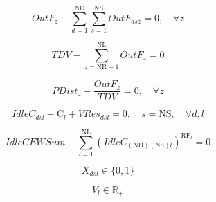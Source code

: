 \documentclass{singlecol}
\theoremstyle{TH}{
\newtheorem{lemma}{Lemma}
\newtheorem{theorem}[lemma]{Theorem}
\newtheorem{corrolary}[lemma]{Corrolary}
\newtheorem{conjecture}[lemma]{Conjecture}
\newtheorem{proposition}[lemma]{Proposition}
\newtheorem{claim}[lemma]{Claim}
\newtheorem{stheorem}[lemma]{Wrong Theorem}
\newtheorem{algorithm}{Algorithm}
}
\theoremstyle{THrm}{
\newtheorem{definition}{Definition}[section]
\newtheorem{question}{Question}[section]
\newtheorem{remark}{Remark}
\newtheorem{scheme}{Scheme}
}
\theoremstyle{THhit}{
\newtheorem{case}{Case}[section]
}
\begin{document}
\begin{equation}
	OutF_{z} - \sum_{d=1}^{\mathrm{ND}}\sum_{s=1}^{\mathrm{NS}}{OutF_{dsz}} = 0, \quad \forall z
	\label{eq:evalTOutFZone}
\end{equation}

\begin{equation}
	TDV - \sum_{z=\mathrm{NR}+1}^{\mathrm{NL}}{OutF_{z}} = 0
	\label{eq:evalTOutF}
\end{equation}

\begin{equation}
	PDist_{z} - \dfrac{OutF_{z}}{TDV} = 0, \quad \forall z
	\label{eq:evalPDist}
\end{equation}

\begin{equation}
	IdleC_{dsl} - \mathrm{C}_{l} + VRes_{dsl} = 0, \quad s = \mathrm{NS}, \quad \forall{d, l}
	\label{eq:evalIdleCap}
\end{equation}

\begin{equation}
	IdleCEWSum - \sum_{l=1}^{\mathrm{NL}}{ (IdleC_{({\mathrm{ND}})({\mathrm{NS}})l})^{\mathrm{RF}_l }    } = 0
	\label{eq:idleCapEWSum}
\end{equation}

\begin{equation}
	X_{dsl} \in \{0, 1\}
	\label{eq:bv}
\end{equation}

\begin{equation}
	V_{l} \in \mathbb{R}_+
	\label{eq:rv}
\end{equation}
\end{document}
